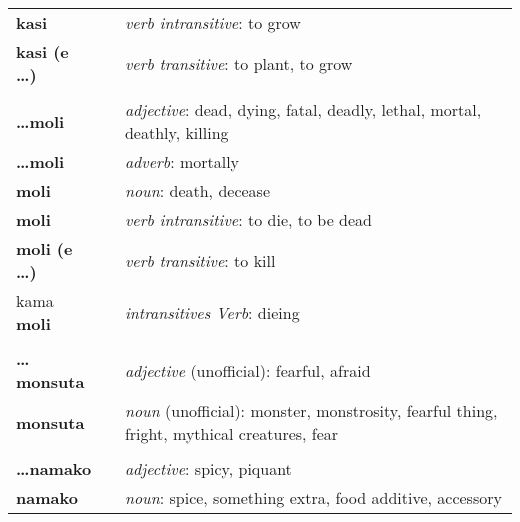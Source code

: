 \begin{supertabular}{p{2,5cm}|ll}
    \textbf{kasi}             &  & \textit{verb intransitive}: to grow                                                               \\
    \textbf{kasi (e \dots)}   &  & \textit{verb transitive}: to plant, to grow                                                       \\
                              &  &                                                                                                   \\
    \textbf{\dots moli}       &  & \textit{adjective}: dead, dying, fatal, deadly, lethal, mortal, deathly, killing                  \\
    \textbf{\dots moli}       &  & \textit{adverb}: mortally                                                                         \\
    \textbf{moli}             &  & \textit{noun}: death, decease                                                                     \\
    \textbf{moli}             &  & \textit{verb intransitive}: to die, to be dead                                                    \\
    \textbf{moli (e \dots)}   &  & \textit{verb transitive}: to kill                                                                 \\
    kama \textbf{moli}        &  & \textit{intransitives Verb}: dieing                                                               \\
                              &  &                                                                                                   \\
    \textbf{\dots monsuta}    &  & \textit{adjective} (unofficial): fearful, afraid                                                  \\
    \textbf{monsuta}          &  & \textit{noun} (unofficial): monster, monstrosity, fearful thing, fright, mythical creatures, fear \\
                              &  &                                                                                                   \\
    \textbf{\dots namako}     &  & \textit{adjective}: spicy, piquant                                                                \\
    \textbf{namako}           &  & \textit{noun}: spice, something extra, food additive, accessory                                   \\

\end{supertabular}
